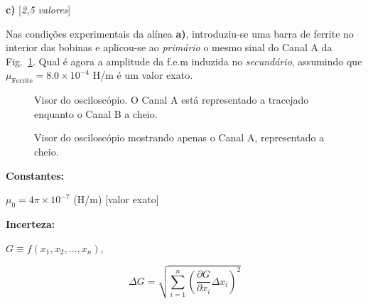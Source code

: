 \documentclass[11pt,a4paper,final]{article}
\begin{document}
\textbf{c)} \hfill [\textit{2,5 valores}]

Nas condi\c{c}\~{o}es experimentais da al\'{i}nea \textbf{a)}, introduziu-se uma barra de ferrite no interior das bobinas e aplicou-se ao \emph{prim\'{a}rio} o mesmo sinal do Canal A da Fig.~\ref{fig:osci1}. Qual \'{e} agora a amplitude da f.e.m induzida no \emph{secund\'{a}rio}, assumindo que $\mu_\text{Ferrite}=8.0\times10^{-4}$ H/m é um valor exato.

\begin{figure}[h]
\begin{center}
\caption{\label{fig:osci1}Visor do oscilosc\'{o}pio. O Canal A est\'{a} representado a tracejado enquanto o Canal B a cheio.}
\end{center}
\end{figure}

\begin{figure}[h]
\begin{center}
\caption{\label{fig:osci2}Visor do oscilosc\'{o}pio mostrando apenas o Canal A, representado a cheio.}
\end{center}
\end{figure}

\cleardoublepage

\noindent\textbf{Constantes:}

\noindent$\mu_0=4\pi\times10^{-7}$ (H/m) [valor exato]

\noindent\textbf{Incerteza:}

\noindent$G \equiv f\left(x_1,x_2,\dotsc,x_n\right)$,

\begin{equation*}
\Delta G = \sqrt{\sum_{i=1}^{n}{\left(\frac{\partial G}{\partial x_i}\Delta x_i\right)^2}}
\end{equation*}
\end{document}
